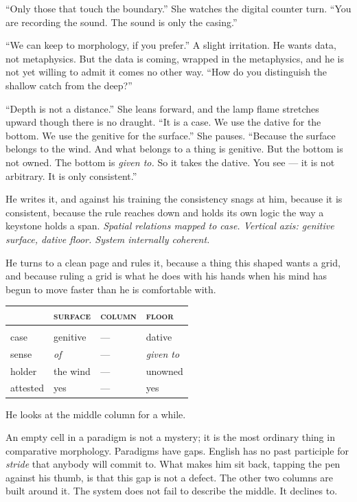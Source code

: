 \documentclass[11pt,oneside]{book}
\newenvironment{paradigm}
  {\par\vspace{0.9em}\begingroup\centering
   \fontsize{9.5}{12}\selectfont
   \renewcommand{\arraystretch}{1.15}}
  {\par\endgroup\vspace{0.9em}\noindent\ignorespaces}
\begin{document}
``Only those that touch the boundary.'' She watches the digital counter
turn. ``You are recording the sound. The sound is only the casing.''

``We can keep to morphology, if you prefer.'' A slight irritation. He
wants data, not metaphysics. But the data is coming, wrapped in the
metaphysics, and he is not yet willing to admit it comes no other way.
``How do you distinguish the shallow catch from the deep?''

``Depth is not a distance.'' She leans forward, and the lamp flame
stretches upward though there is no draught. ``It is a case. We use the
dative for the bottom. We use the genitive for the surface.'' She
pauses. ``Because the surface belongs to the wind. And what belongs to a
thing is genitive. But the bottom is not owned. The bottom is
\emph{given to.} So it takes the dative. You see --- it is not
arbitrary. It is only consistent.''

He writes it, and against his training the consistency snags at him,
because it is consistent, because the rule reaches down and holds its
own logic the way a keystone holds a span. \emph{Spatial relations
mapped to case. Vertical axis: genitive surface, dative floor. System
internally coherent.}

He turns to a clean page and rules it, because a thing this shaped wants
a grid, and because ruling a grid is what he does with his hands when
his mind has begun to move faster than he is comfortable with.

\begin{paradigm}
\begin{tabular}{@{}llll@{}}
& \textsc{surface} & \textsc{column} & \textsc{floor}\\[2pt]
\hline\\[-6pt]
case & genitive & --- & dative\\
sense & \emph{of} & --- & \emph{given to}\\
holder & the wind & --- & unowned\\
attested & yes & --- & yes\\
\end{tabular}
\end{paradigm}

He looks at the middle column for a while.

An empty cell in a paradigm is not a mystery; it is the most ordinary
thing in comparative morphology. Paradigms have gaps. English has no
past participle for \emph{stride} that anybody will commit to. What
makes him sit back, tapping the pen against his thumb, is that this gap
is not a defect. The other two columns are built around it. The system
does not fail to describe the middle. It declines to.
\end{document}
